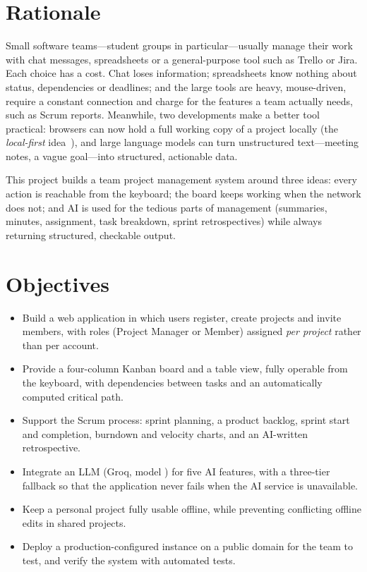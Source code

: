 \documentclass[../main.tex]{subfiles}
\begin{document}
\section{Rationale}
Small software teams---student groups in particular---usually manage their work with chat
messages, spreadsheets or a general-purpose tool such as Trello or Jira. Each choice has a cost.
Chat loses information; spreadsheets know nothing about status, dependencies or deadlines; and the
large tools are heavy, mouse-driven, require a constant connection and charge for the features a
team actually needs, such as Scrum reports. Meanwhile, two developments make a better tool
practical: browsers can now hold a full working copy of a project locally (the
\emph{local-first} idea~\cite{kleppmann2019localfirst}), and large language models can turn
unstructured text---meeting notes, a vague goal---into structured, actionable data.

This project builds a team project management system around three ideas: every action
is reachable from the keyboard; the board keeps working when the network does not; and AI is used
for the tedious parts of management (summaries, minutes, assignment, task breakdown, sprint
retrospectives) while always returning structured, checkable output.

\section{Objectives}
\begin{itemize}
  \item Build a web application in which users register, create projects and invite members, with
        roles (Project Manager or Member) assigned \emph{per project} rather than per account.
  \item Provide a four-column Kanban board and a table view, fully operable from the keyboard,
        with dependencies between tasks and an automatically computed critical path.
  \item Support the Scrum process: sprint planning, a product backlog, sprint start and completion,
        burndown and velocity charts, and an AI-written retrospective.
  \item Integrate an LLM (Groq, model ) for five AI features, with a
        three-tier fallback so that the application never fails when the AI service is unavailable.
  \item Keep a personal project fully usable offline, while preventing conflicting offline edits in
        shared projects.
  \item Deploy a production-configured instance on a public domain for the team to test, and
        verify the system with automated tests.
\end{itemize}
\end{document}
